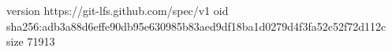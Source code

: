version https://git-lfs.github.com/spec/v1
oid sha256:adb3a88d6effe90db95e630985b83aed9df18ba1d0279d4f3fa52c52f72d112c
size 71913
